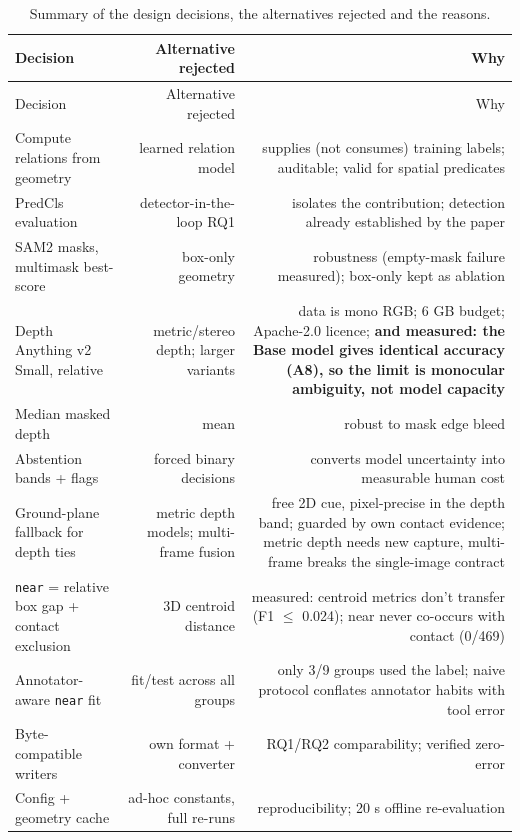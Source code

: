 \begin{center}
\small
\begin{longtable}{lrr}
\caption{Summary of the design decisions, the alternatives rejected and the reasons.}\\
\hline
Decision & Alternative rejected & Why \\
\hline
\endfirsthead
\hline
Decision & Alternative rejected & Why \\
\hline
\endhead
Compute relations from geometry & learned relation model & supplies (not consumes) training labels; auditable; valid for spatial predicates \\
PredCls evaluation & detector-in-the-loop RQ1 & isolates the contribution; detection already established by the paper \\
SAM2 masks, multimask best-score & box-only geometry & robustness (empty-mask failure measured); box-only kept as ablation \\
Depth Anything v2 Small, relative & metric/stereo depth; larger variants & data is mono RGB; 6 GB budget; Apache-2.0 licence; \textbf{and measured: the Base model gives identical accuracy (A8), so the limit is monocular ambiguity, not model capacity} \\
Median masked depth & mean & robust to mask edge bleed \\
Abstention bands + flags & forced binary decisions & converts model uncertainty into measurable human cost \\
Ground-plane fallback for depth ties & metric depth models; multi-frame fusion & free 2D cue, pixel-precise in the depth band; guarded by own contact evidence; metric depth needs new capture, multi-frame breaks the single-image contract \\
\texttt{near} = relative box gap + contact exclusion & 3D centroid distance & measured: centroid metrics don't transfer (F1 $\leq$ 0.024); near never co-occurs with contact (0/469) \\
Annotator-aware \texttt{near} fit & fit/test across all groups & only 3/9 groups used the label; naive protocol conflates annotator habits with tool error \\
Byte-compatible writers & own format + converter & RQ1/RQ2 comparability; verified zero-error \\
Config + geometry cache & ad-hoc constants, full re-runs & reproducibility; 20 s offline re-evaluation \\
\hline
\end{longtable}
\end{center}